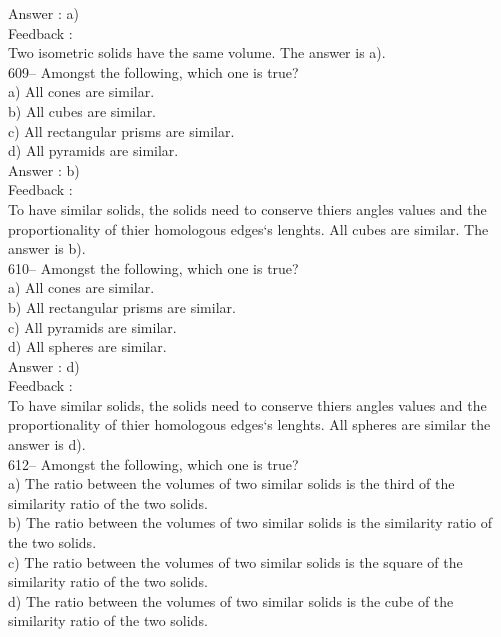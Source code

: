 \documentclass[letterpaper, 12pt]{article}
\begin{document}
Answer : a)\\

Feedback : \\
Two isometric solids have the same volume.  The answer is a).\\

609-- Amongst the following, which one is true?\\
a) All cones are similar.\\
b) All cubes are similar.\\
c) All rectangular prisms are similar.\\
d) All pyramids are similar.\\

Answer : b)\\

Feedback : \\
To have similar solids, the solids need to conserve thiers angles values and the proportionality of thier homologous edges`s lenghts. All cubes are similar.
The answer is b).\\

610-- Amongst the following, which one is true?\\
a) All cones are similar. \\
b) All rectangular prisms are similar.\\
c) All pyramids are similar.\\
d) All spheres are similar.\\

Answer : d)\\

Feedback : \\
To have similar solids, the solids need to conserve thiers angles values and the proportionality of thier homologous edges`s lenghts. All spheres are similar the answer is d).\\


612-- Amongst the following, which one is true?\\
a) The ratio between the volumes of two similar solids is the third of the similarity ratio of the two solids.\\
b) The ratio between the volumes of two similar solids is the similarity ratio of the two solids.\\
c) The ratio between the volumes of two similar solids is the square of the similarity ratio of the two solids.\\
d) The ratio between the volumes of two similar solids is the cube of the similarity ratio of the two solids.\\
\end{document}
